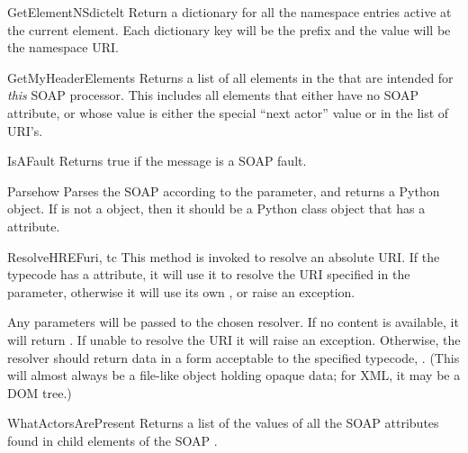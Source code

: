 \begin{methoddesc}{GetElementNSdict}{elt}
Return a dictionary for all the namespace entries active at the
current element. Each dictionary key will be the prefix and the value will
be the namespace URI.
\end{methoddesc}

\begin{methoddesc}{GetMyHeaderElements}{}
Returns a list of all elements in the  that are intended for
\emph{this} SOAP processor.
This includes all elements that either have no SOAP 
attribute, or whose value is either the special ``next actor'' value or
in the  list of URI's.
\end{methoddesc}

\begin{methoddesc}{IsAFault}{}
Returns true if the message is a SOAP fault.
\end{methoddesc}

\begin{methoddesc}{Parse}{how}
Parses the SOAP  according to the  parameter,
and returns a Python object.
If  is not a  object, then it should be a
Python class object that has a  attribute.
\end{methoddesc}

\begin{methoddesc}{ResolveHREF}{uri, tc}
This method is invoked to resolve an absolute URI.
If the typecode  has a  attribute, it will use it
to resolve the URI specified in the  parameter,
otherwise it will use its own , or raise an
 exception.

Any  parameters will be passed to the chosen resolver.
If no content is available, it will return .
If unable to resolve the URI it will raise an
 exception.
Otherwise, the resolver should return data in a form acceptable to the
specified typecode, .
(This will almost always be a file-like object holding opaque data;
for XML, it may be a DOM tree.)
\end{methoddesc}

\begin{methoddesc}{WhatActorsArePresent}{}
Returns a list of the values of all the SOAP  attributes
found in child elements of the SOAP .
\end{methoddesc}

